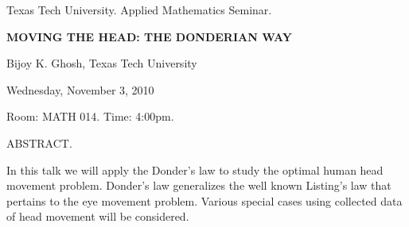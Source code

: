\documentclass[oneside]{amsart}
\newcommand{\talktitle}{Moving the head: The Donderian way}
\newcommand{\talkspeaker}{Bijoy K. Ghosh, Texas Tech University}
\newcommand{\talkdate}{Wednesday, November 3, 2010}
\newcommand{\talkabstract}{
In this talk we will apply the Donder's law to study the optimal human head movement problem.  Donder's law generalizes the well known Listing's law that pertains to the eye movement problem.  Various special cases using collected data of head movement will be considered.
}
\begin{document}
\thispagestyle{empty}

\begin{center}
Texas Tech University.  Applied Mathematics Seminar.

\end{center}

\begin{center}

\textbf{\LARGE {\uppercase{\talktitle}} }

\talkspeaker

\talkdate

Room: MATH 014.  Time: 4:00pm.

\end{center}

ABSTRACT.
\talkabstract
\end{document}
